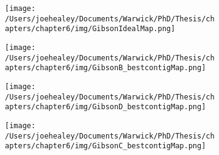 \begin{figure}[p]

\centering
  \begin{subfigure}{\textwidth}
    \texttt{[image: /Users/joehealey/Documents/Warwick/PhD/Thesis/chapters/chapter6/img/GibsonIdealMap.png]}
    \captionsetup{singlelinecheck=off, justification=centering, font=footnotesize, aboveskip=10pt}
    \caption{}
    \label{gibsonidealmap}
  \end{subfigure}

  \begin{subfigure}{\textwidth}
    \texttt{[image: /Users/joehealey/Documents/Warwick/PhD/Thesis/chapters/chapter6/img/GibsonB\_bestcontigMap.png]}
    \captionsetup{singlelinecheck=off, justification=centering, font=footnotesize, aboveskip=10pt}
    \caption{}
  \end{subfigure}

  \begin{subfigure}{\textwidth}
    \texttt{[image: /Users/joehealey/Documents/Warwick/PhD/Thesis/chapters/chapter6/img/GibsonD\_bestcontigMap.png]}
    \captionsetup{singlelinecheck=off, justification=centering, font=footnotesize, aboveskip=10pt}
    \caption{}
  \end{subfigure}
  
  \begin{subfigure}{\textwidth}
    \texttt{[image: /Users/joehealey/Documents/Warwick/PhD/Thesis/chapters/chapter6/img/GibsonC\_bestcontigMap.png]}
    \captionsetup{singlelinecheck=off, justification=centering, font=footnotesize, aboveskip=10pt}
    \caption{}
  \end{subfigure}
    

\end{figure}
